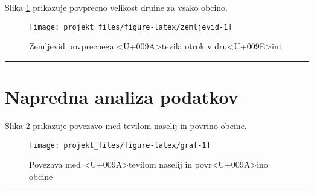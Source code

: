 \documentclass[]{article}
\begin{document}
Slika \ref{fig:zemljevid} prikazuje povprecno velikost druine za vsako
obcino.

\begin{figure}

{\centering \texttt{[image: projekt\_files/figure-latex/zemljevid-1]} 

}

\caption{Zemljevid povprecnega <U+009A>tevila otrok v dru<U+009E>ini}\label{fig:zemljevid}
\end{figure}

\begin{center}\rule{0.5\linewidth}{\linethickness}\end{center}

\section{Napredna analiza podatkov}\label{napredna-analiza-podatkov}

Slika \ref{fig:graf} prikazuje povezavo med tevilom naselij in povrino
obcine.

\begin{figure}

{\centering \texttt{[image: projekt\_files/figure-latex/graf-1]} 

}

\caption{Povezava med <U+009A>tevilom naselij in povr<U+009A>ino obcine}\label{fig:graf}
\end{figure}

\begin{center}\rule{0.5\linewidth}{\linethickness}\end{center}
\end{document}
